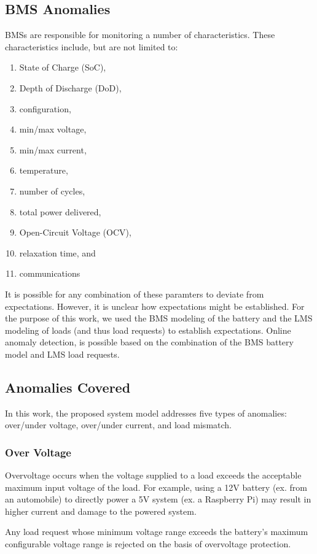 \documentclass[11pt,conference,draftcls,onecolumn]{IEEEtran}
\begin{document}
\subsection{BMS Anomalies}
BMSs are responsible for monitoring a number of characteristics. These characteristics include, but are not limited to:
\begin{enumerate}
    \item State of Charge (SoC),
    \item Depth of Discharge (DoD),
    \item configuration,
    \item min/max voltage,
    \item min/max current,
    \item temperature,
    \item number of cycles,
    \item total power delivered,
    \item Open-Circuit Voltage (OCV),
    \item relaxation time, and
    \item communications
\end{enumerate}

It is possible for any combination of these paramters to deviate from expectations.
However, it is unclear how expectations might be established.
For the purpose of this work, we used the BMS modeling of the battery and the LMS modeling of loads (and thus load requests) to establish expectations.
Online anomaly detection, is possible based on the combination of the BMS battery model and LMS load requests.

\subsection{Anomalies Covered}
In this work, the proposed system model addresses five types of anomalies: over/under voltage, over/under current, and load mismatch.

\subsubsection{Over Voltage}
Overvoltage occurs when the voltage supplied to a load exceeds the acceptable maximum input voltage of the load.
For example, using a 12V battery (ex. from an automobile) to directly power a 5V system (ex. a Raspberry Pi) may result in higher current and damage to the powered system.

Any load request whose minimum voltage range exceeds the battery's maximum configurable voltage range is rejected on the basis of overvoltage protection.
\end{document}
